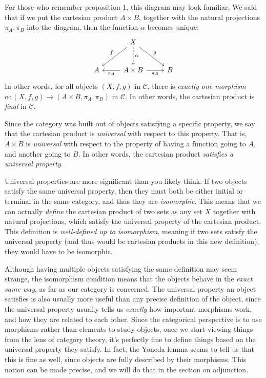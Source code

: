 For those who remember proposition 1, this diagram may look familiar. We said that if we put the cartesian product $A\times B$, together with the natural projections $\pi _A,\pi _B$ into the diagram, then the function $\alpha $ becomes unique:
\[\begin{tikzcd}[row sep = 2.5em, column sep = 2.5em]
 & X\ar[" f "', dl] \ar[" g ", dr] \ar[" \alpha  ", dashed, d]  &  \\
A & A\times B\ar["\pi _A", l] \ar["\pi _B"', r]  & B
\end{tikzcd}\]
In other words, for all objects $(X,f,g)$ in $\mathcal{C} $, there is \emph{exactly one morphism} $\alpha : (X,f,g) \to (A\times B,\pi _A,\pi _B)$ in $\mathcal{C} $. In other words, the cartesian product is \emph{final} in $\mathcal{C} $.

Since the category was built out of objects satisfying a specific property, we say that the cartesian product is \emph{universal} with respect to this property. That is, $A\times B$ is \emph{universal} with respect to the property of having a function going to $A$, and another going to $B$. In other words, the cartesian product \emph{satisfies a universal property}.

Universal properties are more significant than you likely think. If two objects satisfy the same universal property, then they must both be either initial or terminal in the same category, and thus they are \emph{isomorphic}. This means that we can actually \emph{define} the cartesian product of two sets as any set $X$ together with natural projections, which satisfy the universal property of the cartesian product. This definition is \emph{well-defined up to isomorphism}, meaning if two sets satisfy the universal property (and thus would be cartesian products in this new definition), they would have to be isomorphic.

Although having multiple objects satisfying the same definition may seem strange, the isomorphism condition means that the objects behave in the \emph{exact same way}, as far as our category is concerned. The universal property an object satisfies is also usually more useful than any precise definition of the object, since the universal property usually tells us \emph{exactly} how important morphisms work, and how they are related to each other. Since the categorical perspective is to use morphisms rather than elements to study objects, once we start viewing things from the lens of category theory, it's perfectly fine to define things based on the universal property they satisfy. In fact, the Yoneda lemma seems to tell us that this is fine as well, since objects are fully described by their morphisms. This notion can be made precise, and we will do that in the section on adjunction.

